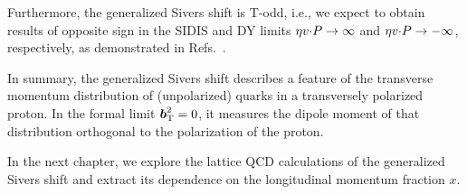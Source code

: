 Furthermore, the generalized Sivers shift is T-odd, i.e., we expect to obtain results of opposite sign in the SIDIS and DY limits $\eta v {\cdot} P \rightarrow \infty$ and $\eta v {\cdot} P \rightarrow -\infty$, respectively, as demonstrated in Refs.~\cite{Musch:2011er,Yoon:2017qzo}.

In summary, the generalized Sivers shift describes a feature of the transverse momentum distribution of (unpolarized) quarks in a transversely polarized proton. In the formal limit $\boldsymbol{b}_{\mathrm T}^2 = 0$, it measures the dipole moment of that distribution orthogonal to the polarization of the proton.

In the next chapter, we explore the lattice QCD calculations of the generalized Sivers shift and extract its dependence on the longitudinal momentum fraction $x$.